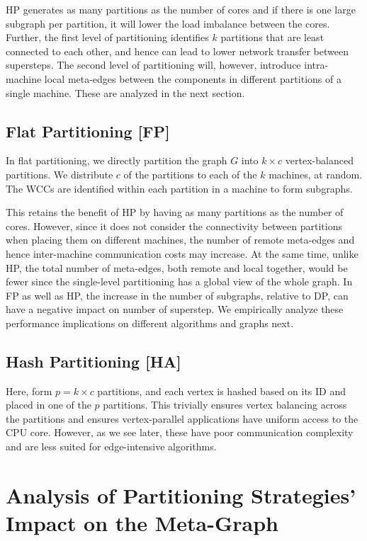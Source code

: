 \documentclass[10pt,conference, compsocconf]{IEEEtran}
\begin{document}
HP generates as many partitions as the number of cores and if there is one large subgraph per partition, it will lower the load imbalance between the cores. Further, the first level of partitioning identifies $k$ partitions that are least connected to each other, and hence can lead to lower network transfer between supersteps. The second level of partitioning will, however, introduce intra-machine local meta-edges between the components in different partitions of a single machine.  These are analyzed in the next section. 

\subsection{Flat Partitioning [FP]} In flat partitioning, we directly partition the graph $G$ into $k \times c$ vertex-balanced partitions. We distribute $c$ of the partitions to each of the $k$ machines, at random. The WCCs are identified within each partition in a machine to form subgraphs. 

This retains the benefit of HP by having as many partitions as the number of cores. However, since it does not consider the connectivity between partitions when placing them on different machines, the number of remote meta-edges and hence inter-machine communication costs may increase. At the same time, unlike HP, the total number of meta-edges, both remote and local together, would be fewer since the single-level partitioning has a global view of the whole graph. In FP as well as HP, the increase in the number of subgraphs, relative to DP, can have a negative impact on number of superstep. We empirically analyze these performance implications on different algorithms and graphs next.

\subsection{Hash Partitioning [HA]}
Here, form $p=k \times c$ partitions, and each vertex is hashed based on its ID and placed in one of the $p$ partitions. This trivially ensures vertex balancing across the partitions and ensures vertex-parallel applications have uniform access to the CPU core. However, as we see later, these have poor communication complexity and are less suited for edge-intensive algorithms.



\section{Analysis of Partitioning Strategies' Impact on the Meta-Graph}\label{sec:metagraph}
\end{document}
